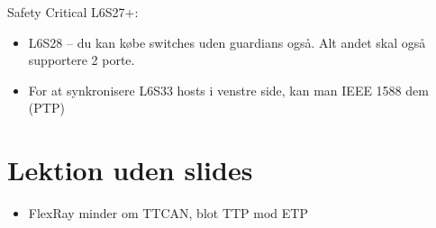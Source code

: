 \documentclass[oneside, 10pt]{article}
\begin{document}
Safety Critical L6S27+:
\begin{itemize}
	\item L6S28 -- du kan købe switches uden guardians også. Alt andet skal også supportere 2 porte.
	\item For at synkronisere L6S33 hosts i venstre side, kan man IEEE 1588 dem (PTP)
\end{itemize}







\newpage
\section{Lektion uden slides}

\begin{itemize}
	\item FlexRay minder om TTCAN, blot TTP mod ETP
\end{itemize}
\end{document}
